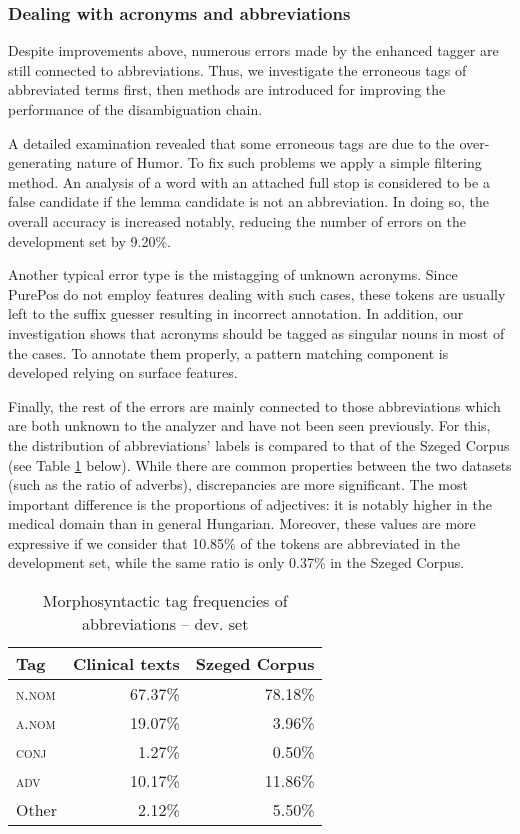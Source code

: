 \subsubsection{Dealing with acronyms and abbreviations}

Despite improvements above, numerous errors made by the enhanced tagger are still connected to abbreviations. 
Thus, we investigate the erroneous tags of abbreviated terms first, then methods are introduced for improving the performance of the disambiguation chain. 

A detailed examination revealed that some erroneous tags are due to the over-generating nature of Humor. 
To fix such problems we apply a simple filtering method. 
An analysis of a word with an attached full stop is considered to be a false candidate if the lemma candidate is not an abbreviation. 
In doing so, the overall accuracy is increased notably, reducing the number of errors on the development set by 9.20\%.

Another typical error type is the mistagging of unknown acronyms. 
Since PurePos do not employ features  dealing with such cases, these tokens are usually left to the suffix guesser resulting in incorrect annotation. 
In addition, our investigation shows that acronyms should be tagged as singular nouns in most of the cases. 
To annotate them properly, a pattern matching component is developed relying on surface features.

Finally, the rest of the errors are mainly connected to those abbreviations which are both unknown to the analyzer and have not been seen previously. 
For this, the distribution of abbreviations' labels is compared to that of the Szeged Corpus (see Table \ref{tab:pos_distribution} below).
While there are common properties between the two datasets (such as the ratio of adverbs), discrepancies are more significant. 
The most important difference is the proportions of adjectives: it is notably higher in the medical domain than in general Hungarian. 
Moreover, these values are more expressive if we consider that 10.85\% of the tokens are abbreviated in the development set, while the same ratio is only 0.37\% in the Szeged Corpus. 

\begin{table}[h]
\centering
\caption{Morphosyntactic tag frequencies of abbreviations -- dev. set}
\label{tab:pos_distribution}
\begin{tabular}{ l r r} 
\hline
Tag & Clinical texts & Szeged Corpus  \\ 
\hline
\scshape{n.nom} & 67.37\% & 78.18\% \\
\scshape{a.nom} & 19.07\% & 3.96\% \\
\scshape{conj} & 1.27\% & 0.50\% \\
\scshape{adv} & 10.17\% & 11.86\% \\
Other & 2.12\% & 5.50\% \\
\hline
\end{tabular}
\end{table}

